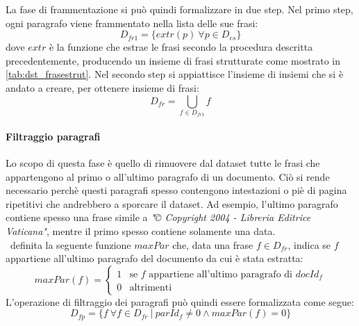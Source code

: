 La fase di frammentazione si può quindi formalizzare in due step. Nel primo step, ogni paragrafo viene frammentato nella lista delle sue frasi:
\begin{equation}
D_{fr1} = \{ extr(p)\ \forall p \in D_{es}  \}
\end{equation}
dove $extr$ è la funzione che estrae le frasi secondo la procedura descritta precedentemente, producendo un insieme di frasi strutturate come mostrato in \autoref{tab:dst_frasestrut}. Nel secondo step si appiattisce l'insieme di insiemi che si è andato a creare, per ottenere insieme di frasi:
\begin{equation}
D_{fr} = \bigcup\limits_{f \in D_{fr1}} f
\end{equation}

\paragraph{Filtraggio paragrafi}
Lo scopo di questa fase è quello di rimuovere dal dataset tutte le frasi che appartengono al primo o all'ultimo paragrafo di un documento. Ciò si rende necessario perchè questi paragrafi spesso contengono intestazioni o piè di pagina ripetitivi che andrebbero a sporcare il dataset. Ad esempio, l'ultimo paragrafo contiene spesso una frase simile  a \textit{"© Copyright 2004 - Libreria Editrice Vaticana"}, mentre il primo spesso contiene solamente una data.\\
\E\ definita la seguente funzione $\textit{maxPar}$ che, data una frase $f \in D_{fr}$, indica se $f$ appartiene all'ultimo paragrafo del documento da cui è stata estratta:
\begin{equation}
  maxPar(f) =
    \begin{cases}
      1 & \text{se $f$ appartiene all'ultimo paragrafo di $docId_f$}\\
      0 & \text{altrimenti}
    \end{cases}       
\end{equation}
L'operazione di filtraggio dei paragrafi può quindi essere formalizzata come segue:
\begin{equation}
D_{fp} = \{ f \ \forall f \in D_{fr}\ |\  parId_{f} \neq 0 \wedge maxPar(f) = 0     \}
\end{equation}

